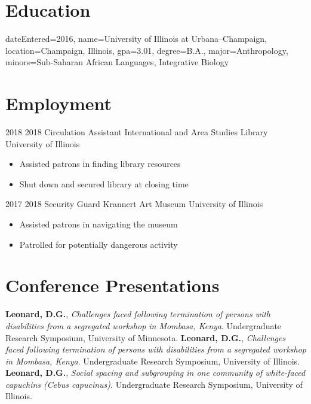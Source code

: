 \documentclass{cv}
\author{Daniel Leonard}
\begin{document}
\maketitle

\section{Education}
\secitemeducation
	{dateEntered=2016,
	name=University of Illinois at Urbana--Champaign,
	location={Champaign, Illinois},
	gpa=3.01,
	degree=B.A.,
	major=Anthropology,
	minors={Sub-Saharan African Languages, Integrative Biology}}

\section{Employment}
\secitemexperience
	{2018}
	{2018}
	{Circulation Assistant}
	{International and Area Studies Library}
	{University of Illinois}
	{
		\begin{itemize}
			\item Assisted patrons in finding library resources
			\item Shut down and secured library at closing time
		\end{itemize}
	}
\secitemexperience
	{2017}
	{2018}
	{Security Guard}
	{Krannert Art Museum}
	{University of Illinois}
	{
		\begin{itemize}
			\item Assisted patrons in navigating the museum
			\item Patrolled for potentially dangerous activity
		\end{itemize}
	}


\section{Conference Presentations}
	{{\textbf {Leonard, D.G.}}, {\textit {Challenges faced following termination of persons with disabilities from a segregated workshop in Mombasa, Kenya}}. Undergraduate Research Symposium, University of Minnesota.}
	{{\textbf {Leonard, D.G.}}, {\textit {Challenges faced following termination of persons with disabilities from a segregated workshop in Mombasa, Kenya}}. Undergraduate Research Symposium, University of Illinois.}
	{{\textbf {Leonard, D.G.}}, {\textit {Social spacing and subgrouping in one community of white-faced capuchins ({{Cebus capucinus}})}}. Undergraduate Research Symposium, University of Illinois.}
\end{document}
